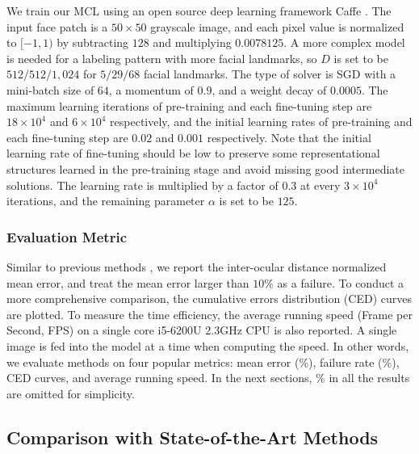 \documentclass[journal]{IEEEtran}
\begin{document}
We train our MCL using an open source deep learning framework Caffe \cite{jia2014caffe}. The input face patch is a $50\times50$ grayscale image, and each pixel value is normalized to $[-1,1)$ by subtracting $128$ and multiplying $0.0078125$. A more complex model is needed for a labeling pattern with more facial landmarks, so $D$ is set to be $512 / 512 / 1,024$ for $5 / 29 / 68$ facial landmarks. The type of solver is SGD with a mini-batch size of $64$, a momentum of $0.9$, and a weight decay of $0.0005$. The maximum learning iterations of pre-training and each fine-tuning step are $18\times10^4$ and $6\times10^4$ respectively, and the initial learning rates of pre-training and each fine-tuning step are $0.02$ and $0.001$ respectively. Note that the initial learning rate of fine-tuning should be low to preserve some representational structures learned in the pre-training stage and avoid missing good intermediate solutions. The learning rate is multiplied by a factor of $0.3$ at every $3\times10^4$ iterations, and the remaining parameter $\alpha$ is set to be $125$.

\subsubsection{Evaluation Metric}
\label{sssec:metric}

Similar to previous methods \cite{cao2012face,sun2013deep,zhang2015learning}, we report the inter-ocular distance normalized mean error, and treat the mean error larger than $10\%$ as a failure. To conduct a more comprehensive comparison, the cumulative errors distribution (CED) curves are plotted. To measure the time efficiency, the average running speed (Frame per Second, FPS) on a single core i5-6200U 2.3GHz CPU is also reported. A single image is fed into the model at a time when computing the speed. In other words, we evaluate methods on four popular metrics: mean error (\%), failure rate (\%), CED curves, and average running speed. In the next sections, \% in all the results are omitted for simplicity.

\subsection{Comparison with State-of-the-Art Methods}
\label{ssec:compare}
\end{document}
